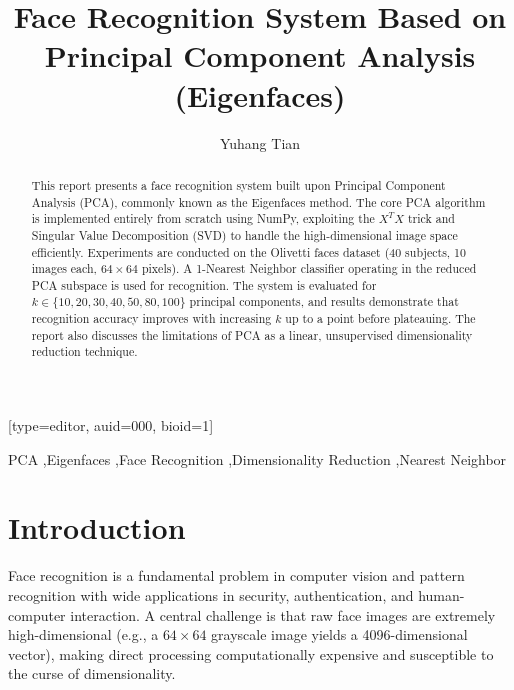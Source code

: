 \documentclass[a4paper,fleqn]{cas-sc}
\begin{document}
\let\WriteBookmarks\relax
\def\floatpagepagefraction{1}
\def\textpagefraction{.001}


\title [mode = title]{Face Recognition System Based on Principal Component Analysis (Eigenfaces)} 

\author[1]{Yuhang Tian}[type=editor,
        auid=000,
        bioid=1]


\begin{abstract}
This report presents a face recognition system built upon Principal Component Analysis (PCA), commonly known as the Eigenfaces method. The core PCA algorithm is implemented entirely from scratch using NumPy, exploiting the $X^T X$ trick and Singular Value Decomposition (SVD) to handle the high-dimensional image space efficiently. Experiments are conducted on the Olivetti faces dataset (40 subjects, 10 images each, $64\times64$ pixels). A 1-Nearest Neighbor classifier operating in the reduced PCA subspace is used for recognition. The system is evaluated for $k \in \{10, 20, 30, 40, 50, 80, 100\}$ principal components, and results demonstrate that recognition accuracy improves with increasing $k$ up to a point before plateauing. The report also discusses the limitations of PCA as a linear, unsupervised dimensionality reduction technique.
\end{abstract}

\begin{keywords}
PCA \sep Eigenfaces \sep Face Recognition \sep Dimensionality Reduction \sep Nearest Neighbor
\end{keywords}

\maketitle

\section{Introduction}

Face recognition is a fundamental problem in computer vision and pattern recognition with wide applications in security, authentication, and human-computer interaction. A central challenge is that raw face images are extremely high-dimensional (e.g., a $64\times64$ grayscale image yields a 4096-dimensional vector), making direct processing computationally expensive and susceptible to the curse of dimensionality.
\end{document}
